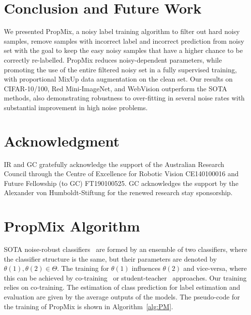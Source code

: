 \documentclass{bmvc2k}
\begin{document}
\vspace{-.3in}
\section{Conclusion and Future Work}


We presented PropMix, a noisy label training algorithm to filter out hard noisy samples, remove samples with incorrect label and incorrect prediction from noisy set with the goal to keep the easy noisy samples that have a higher chance to be correctly re-labelled. PropMix reduces noisy-dependent parameters, while promoting the use of the entire filtered noisy set in a fully supervised training, with proportional MixUp data augmentation on the clean set. Our results on CIFAR-10/100, Red Mini-ImageNet, and WebVision outperform the SOTA methods, also demonstrating robustness to over-fitting in several noise rates with substantial improvement in high noise problems. 


\section{Acknowledgment}
IR and GC gratefully acknowledge the support of the Australian Research Council through the Centre of Excellence for Robotic Vision CE140100016 and Future Fellowship (to GC) FT190100525.  GC acknowledges the support by the Alexander von Humboldt-Stiftung for the renewed research stay sponsorship. 




\newpage

\appendix

\section{PropMix Algorithm}
\label{sec:algorithm}

SOTA noise-robust classifiers~\citep{DivideMix,nguyen2019self, elr2020} are formed by an ensemble of two classifiers, where the classifier structure is the same, but their parameters are denoted by $\theta(1),\theta(2) \in \Theta$.  The training for $\theta(1)$ influences $\theta(2)$ and vice-versa, where this can be achieved by co-training~\cite{DivideMix, elr2020}  or student-teacher~\cite{nguyen2019self} approaches. Our training relies on co-training. The estimation of class prediction for label estimation and evaluation are given by the average outputs of the models. The pseudo-code for the training of PropMix is shown in Algorithm~\ref{alg:PM}.
\end{document}
